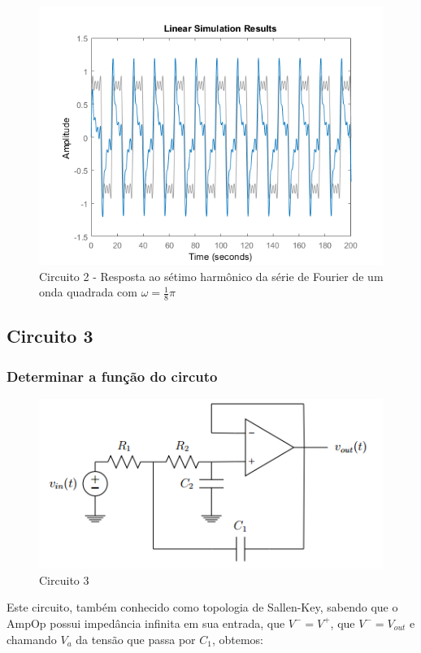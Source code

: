 \documentclass[a4paper, 12pt]{article}
\begin{document}
			\begin{figure}[!ht]
				\centering
				\includegraphics[scale=0.71]{img/1m_circ2.png}
				\caption{Circuito 2 - Resposta ao sétimo harmônico da série de Fourier de um onda quadrada com $\omega = \frac{1}{8}\pi$}
			\end{figure}
		\subsection{Circuito 3}
			\subsubsection{Determinar a função do circuto}
			\begin{figure}[!ht]
				\centering
				\includegraphics{img/circuito3.png}
				\caption{Circuito 3}
			\end{figure}

			Este circuito, também conhecido como topologia de Sallen-Key, sabendo que o AmpOp possui impedância infinita em sua entrada, que $V^{-} = V^{+}$, que $V^{-} = V_{out}$ e chamando $V_{a}$ da tensão que passa por $C_{1}$, obtemos:
\end{document}
